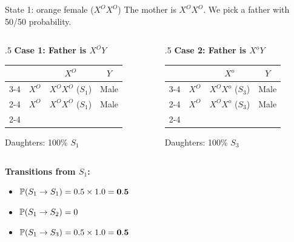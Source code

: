 \documentclass[aspectratio=169]{beamer}\usepackage[]{graphicx}\usepackage[]{xcolor}
\begin{document}
\begin{frame}{State 1: orange female ($X^O X^O$)}
    The mother is $X^O X^O$. We pick a father with 50/50 probability.
    
    \begin{columns}[T]
        \begin{column}{.5\textwidth}
            \centering
            \textbf{Case 1: Father is $X^O Y$}
            \renewcommand{\arraystretch}{1.5}
            \begin{tabular}{c c | c | c |}
            \multicolumn{2}{c}{} & \multicolumn{1}{c}{$X^O$} & \multicolumn{1}{c}{$Y$} \\ \cline{3-4}
            \multirow{2}{*}{\rotatebox{90}{Mother}} & $X^O$ & \cellcolor{punnettorange}$X^O X^O$ ($S_1$) & \cellcolor{punnettorange}Male \\ \cline{2-4}
            & $X^O$ & \cellcolor{punnettorange}$X^O X^O$ ($S_1$) & \cellcolor{punnettorange}Male \\ \cline{2-4}
            \end{tabular}
            \vspace{1em}
            
            Daughters: 100\% $S_1$
        \end{column}
        \begin{column}{.5\textwidth}
            \centering
            \textbf{Case 2: Father is $X^o Y$}
            \renewcommand{\arraystretch}{1.5}
            \begin{tabular}{c c | c | c |}
            \multicolumn{2}{c}{} & \multicolumn{1}{c}{$X^o$} & \multicolumn{1}{c}{$Y$} \\ \cline{3-4}
            \multirow{2}{*}{\rotatebox{90}{Mother}} & $X^O$ & \cellcolor{punnetttortie}$X^O X^o$ ($S_3$) & \cellcolor{punnettorange}Male \\ \cline{2-4}
            & $X^O$ & \cellcolor{punnetttortie}$X^O X^o$ ($S_3$) & \cellcolor{punnettorange}Male \\ \cline{2-4}
            \end{tabular}
            \vspace{1em}
            
            Daughters: 100\% $S_3$
        \end{column}
    \end{columns}
    
    \vfill
    \textbf{Transitions from $S_1$:}
    \begin{itemize}
        \item $\mathbb{P}(S_1 \to S_1) = 0.5 \times 1.0 = \mathbf{0.5}$
        \item $\mathbb{P}(S_1 \to S_2) = 0$
        \item $\mathbb{P}(S_1 \to S_3) = 0.5 \times 1.0 = \mathbf{0.5}$
    \end{itemize}
\end{frame}
\end{document}
